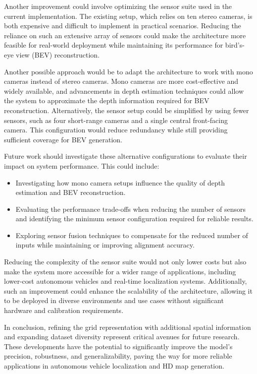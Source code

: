 Another improvement could involve optimizing the sensor suite used in the current implementation. The existing setup, which relies on ten stereo cameras, is both expensive and difficult to implement in practical scenarios. Reducing the reliance on such an extensive array of sensors could make the architecture more feasible for real-world deployment while maintaining its performance for bird’s-eye view (BEV) reconstruction.

Another possible approach would be to adapt the architecture to work with mono cameras instead of stereo cameras. Mono cameras are more cost-effective and widely available, and advancements in depth estimation techniques could allow the system to approximate the depth information required for BEV reconstruction. Alternatively, the sensor setup could be simplified by using fewer sensors, such as four short-range cameras and a single central front-facing camera. This configuration would reduce redundancy while still providing sufficient coverage for BEV generation.

Future work should investigate these alternative configurations to evaluate their impact on system performance. This could include:
\begin{itemize}
    \item Investigating how mono camera setups influence the quality of depth estimation and BEV reconstruction.
    \item Evaluating the performance trade-offs when reducing the number of sensors and identifying the minimum sensor configuration required for reliable results.
    \item Exploring sensor fusion techniques to compensate for the reduced number of inputs while maintaining or improving alignment accuracy.
\end{itemize}

Reducing the complexity of the sensor suite would not only lower costs but also make the system more accessible for a wider range of applications, including lower-cost autonomous vehicles and real-time localization systems. Additionally, such an improvement could enhance the scalability of the architecture, allowing it to be deployed in diverse environments and use cases without significant hardware and calibration requirements.

In conclusion, refining the grid representation with additional spatial information and expanding dataset diversity represent critical avenues for future research. These developments have the potential to significantly improve the model’s precision, robustness, and generalizability, paving the way for more reliable applications in autonomous vehicle localization and HD map generation.